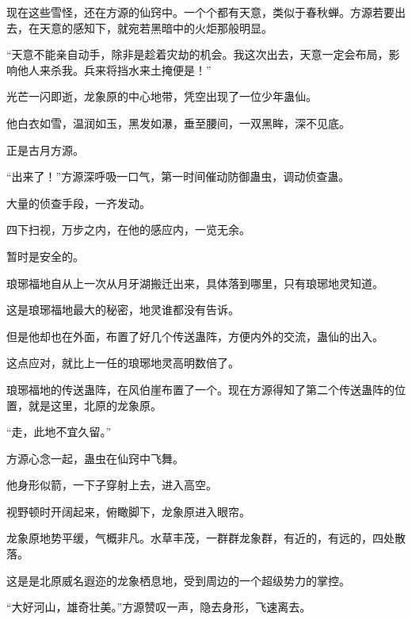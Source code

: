 \begin{this_body}
现在这些雪怪，还在方源的仙窍中。一个个都有天意，类似于春秋蝉。方源若要出去，在天意的感知下，就宛若黑暗中的火炬那般明显。

“天意不能亲自动手，除非是趁着灾劫的机会。我这次出去，天意一定会布局，影响他人来杀我。兵来将挡水来土掩便是！”

光芒一闪即逝，龙象原的中心地带，凭空出现了一位少年蛊仙。

他白衣如雪，温润如玉，黑发如瀑，垂至腰间，一双黑眸，深不见底。

正是古月方源。

“出来了！”方源深呼吸一口气，第一时间催动防御蛊虫，调动侦查蛊。

大量的侦查手段，一齐发动。

四下扫视，万步之内，在他的感应内，一览无余。

暂时是安全的。

琅琊福地自从上一次从月牙湖搬迁出来，具体落到哪里，只有琅琊地灵知道。

这是琅琊福地最大的秘密，地灵谁都没有告诉。

但是他却也在外面，布置了好几个传送蛊阵，方便内外的交流，蛊仙的出入。

这点应对，就比上一任的琅琊地灵高明数倍了。

琅琊福地的传送蛊阵，在风伯崖布置了一个。现在方源得知了第二个传送蛊阵的位置，就是这里，北原的龙象原。

“走，此地不宜久留。”

方源心念一起，蛊虫在仙窍中飞舞。

他身形似箭，一下子穿射上去，进入高空。

视野顿时开阔起来，俯瞰脚下，龙象原进入眼帘。

龙象原地势平缓，气概非凡。水草丰茂，一群群龙象群，有近的，有远的，四处散落。

这是是北原威名遐迩的龙象栖息地，受到周边的一个超级势力的掌控。

“大好河山，雄奇壮美。”方源赞叹一声，隐去身形，飞速离去。

\end{this_body}
